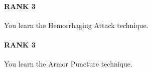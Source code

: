 \paragraph{RANK 3} You learn the Hemorrhaging Attack technique.

\paragraph{RANK 3} You learn the Armor Puncture technique.


